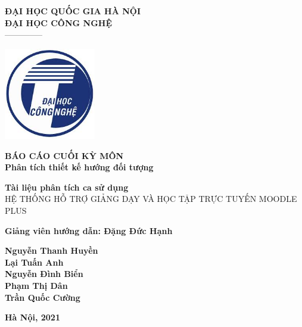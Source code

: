 \documentclass[./main.tex]{subfiles}
\begin{document}
\begin{titlepage}	
	\begin{center}
		\textbf{ĐẠI HỌC QUỐC GIA HÀ NỘI}\\
		\textbf{ĐẠI HỌC CÔNG NGHỆ}\\
		--------------
	
		\vspace*{30pt}
		
		\includegraphics[width=0.3\textwidth]{./images/uet.jpg}
		
		\vspace*{50pt}
		
		\textbf{BÁO CÁO CUỐI KỲ MÔN 
			\\ Phân tích thiết kế hướng đối tượng}
		\vspace*{30pt}
		
		\textbf{Tài liệu phân tích ca sử dụng\\}
		{\Large HỆ THỐNG HỖ TRỢ GIẢNG DẠY VÀ HỌC TẬP TRỰC TUYẾN MOODLE PLUS}
		
		\vspace*{50pt}
		
		\textbf{Giảng viên hướng dẫn: Đặng Đức Hạnh}
		
		\vspace*{30pt}
		
		\textbf{Nguyễn Thanh Huyền\\
			Lại Tuấn Anh\\
			Nguyễn Đình Biển\\
			Phạm Thị Dân\\
			Trần Quốc Cường\\
		}
		
		\vspace*{40pt}
	\end{center}
	
	
	\begin{center}
		\textbf{Hà Nội, 2021}
	\end{center}
\end{titlepage}
\end{document}
